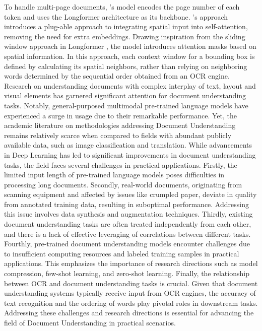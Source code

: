 To handle multi-page documents, \citet{pramanik2020towards}'s model encodes the page number of each token and uses the Longformer architecture as its backbone. \citet{pham2022understanding}'s approach introduces a plug-able approach to integrating spatial input into self-attention, removing the need for extra embeddings. Drawing inspiration from the sliding window approach in Longformer \citep{beltagy2020longformer}, the model introduces attention masks based on spatial information. In this approach, each context window for a bounding box is defined by calculating its spatial neighbors, rather than relying on neighboring words determined by the sequential order obtained from an \ac{OCR} engine. \\



Research on understanding documents with complex interplay of text, layout and visual elements has garnered significant attention for document understanding tasks. Notably, general-purposed multimodal pre-trained language models have  experienced a surge in usage due to their remarkable performance. Yet, the academic literature on methodologies addressing Document Understanding remains relatively scarce when compared to fields with abundant publicly available data, such as image classification and translation. While advancements in Deep Learning has led to significant improvements in document understanding tasks, the field faces several challenges in practical applications. Firstly, the limited input length of pre-trained language models poses difficulties in processing long documents. Secondly, real-world documents, originating from scanning equipment and affected by issues like crumpled paper, deviate in quality from annotated training data, resulting in suboptimal performance. Addressing this issue involves data synthesis and augmentation techniques. Thirdly, existing document understanding tasks are often treated independently from each other, and there is a lack of effective leveraging of correlations between different tasks. Fourthly, pre-trained document understanding models encounter challenges due to insufficient computing resources and labeled training samples in practical applications. This emphasizes the importance of research directions such as model compression, few-shot learning, and zero-shot learning. Finally, the relationship between \ac{OCR} and document understanding tasks is crucial. Given that document understanding systems typically receive input from \ac{OCR} engines, the accuracy of text recognition and the ordering of words play pivotal roles in downstream tasks. Addressing these challenges and research directions is essential for advancing the field of Document Understanding in practical scenarios.

\acresetall

